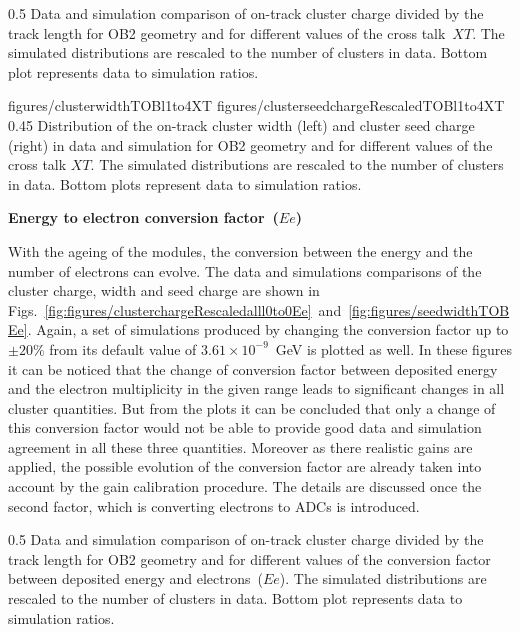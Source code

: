                  {0.5}       %
                 { Data and simulation comparison of on-track cluster charge divided by the track length for OB2 geometry and for different values of the cross talk~$XT$.  The simulated distributions are rescaled to the number of clusters in data.  Bottom plot represents data to simulation ratios. }

                 {figures/clusterwidthTOBl1to4XT}
                 {figures/clusterseedchargeRescaledTOBl1to4XT} %
                 {0.45}       %
                 { Distribution of the on-track cluster width (left) and cluster seed charge (right) in data and simulation for OB2 geometry and for different values of the cross talk $XT$.  The simulated distributions are rescaled to the number of clusters in data.  Bottom plots represent data to simulation ratios. }

\textbf{Energy to electron conversion factor~($Ee$)}

With the ageing of the modules, the conversion between the energy and the number of electrons can evolve. The data and simulations comparisons of the cluster charge, width and seed charge are shown in Figs.~\ref{fig:figures/clusterchargeRescaledalll0to0Ee}~and~\ref{fig:figures/seedwidthTOBEe}. Again, a set of simulations produced by changing the conversion factor up to $\pm 20\%$ from its default value of $3.61 \times 10^{-9}$~GeV is plotted as well. In these figures it can be noticed that the change of conversion factor between deposited energy and the electron multiplicity in the given range leads to significant changes in all cluster quantities. But from the plots it can be concluded that only a change of this conversion factor would not be able to provide good data and simulation agreement in all these three quantities. Moreover as there realistic gains are applied, the possible evolution of the conversion factor are already taken into account by the gain calibration procedure. The details are discussed once the second factor, which is converting electrons to ADCs is introduced.

                 {0.5}       %
                 { Data and simulation comparison of on-track cluster charge divided by the track length for OB2 geometry and for different values of the conversion factor between deposited energy and electrons~($Ee$). The simulated distributions are rescaled to the number of clusters in data.  Bottom plot represents data to simulation ratios. }

